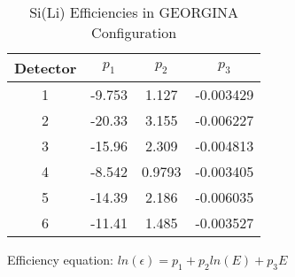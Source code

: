 \begin{table}[]
    \centering
    \caption{Si(Li) Efficiencies in GEORGINA Configuration}
    \label{tab:sili_eff_georgina}
    \begin{threeparttable}
    \begin{tabular}{c|c|c|c}
    \toprule
        Detector & $p_1$ & $p_2$ & $p_3$ \\
        \hline
        1	&	-9.753	&	1.127	&	-0.003429	\\
        2	&	-20.33	&	3.155	&	-0.006227	\\
        3	&	-15.96	&	2.309	&	-0.004813	\\
        4	&	-8.542	&	0.9793	&	-0.003405	\\
        5	&	-14.39	&	2.186	&	-0.006035	\\
        6	&	-11.41	&	1.485	&	-0.003527	\\
        \bottomrule
    \end{tabular}
    \begin{tablenotes}[para]
        Efficiency equation: $ln(\epsilon) = p_1+p_2ln(E)+p_3E$
    \end{tablenotes}
\end{threeparttable}
\end{table}